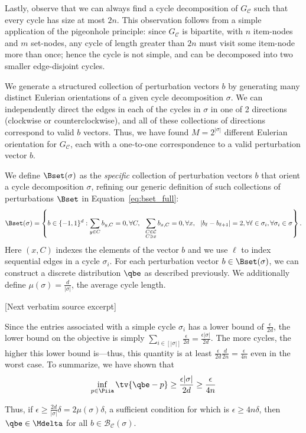 \documentclass[10pt]{article}
\begin{document}
\begin{ReviewVerbatim}
	Lastly, observe that we can always find a cycle decomposition of $G_\mathcal{C}$ such that every cycle has size at most $2n$. This observation follows from a simple application of the pigeonhole principle: since $G_\mathcal{C}$ is bipartite, with $n$ item-nodes and $m$ set-nodes, any cycle of length greater than $2n$ must visit some item-node more than once; hence the cycle is not simple, and can be decomposed into two smaller edge-disjoint cycles.

	We generate a structured collection of perturbation vectors $b$ by generating many distinct Eulerian orientations of a given cycle decomposition $\sigma$. We can independently direct the edges in each of the	cycles in $\sigma$ in one of 2 directions (clockwise or counterclockwise), and all of these collections of directions correspond to valid $b$ vectors. Thus, we have found $M=2^{|\sigma|}$ different Eulerian orientation for $G_\mathcal{C}$, each with a one-to-one correspondence to a valid perturbation vector $b$.

	We define $\Bset(\sigma)$ as the {\it specific} collection of perturbation vectors $b$ that orient a cycle decomposition $\sigma$, refining our generic definition of such collections of perturbations $\Bset$ in Equation~\eqref{eq:bset_full}:
	\begin{align}
	\label{eq:bset}
	\Bset(\sigma) =
	\left \{
	b \in \lbrace -1, 1 \rbrace^d
	:
	\sum_{y \in C} b_{y,C} = 0, \forall C,
	\ \
	\sum_{\substack{C \in \mathcal{C}\\ C \ni x}} b_{x,C} = 0, \forall x,
	\ \
	|b_\ell - b_{\ell+1} | =2, \forall \ell \in \sigma_i,
	\forall \sigma_i \in \sigma
	\right \}.
	\end{align}
	Here $(x,C)$ indexes the elements of the vector $b$ and we use $\ell$ to index sequential edges in a cycle $\sigma_i$. For each perturbation vector $b \in \Bset(\sigma)$, we can construct a discrete distribution $\qbe$ as described previously. We additionally define $\mu(\sigma) = \frac{d}{|\sigma|}$, the average cycle length.

[Next verbatim source excerpt]

		Since the entries associated with a simple cycle $\sigma_i$ has a lower bound of $\frac{\epsilon}{2d}$, the lower bound on the objective is simply $\sum_{i \in [|\sigma|]} \frac{\epsilon}{2d} = \frac{\epsilon |\sigma|}{2d}$. The more cycles, the higher this lower bound is---thus, this quantity is at least $\frac{\epsilon}{2d} \frac{d}{2n} = \frac{\epsilon}{4n}$ even in the worst case. To summarize, we have shown that
		\begin{align*}
		\inf_{p \in \Piia} \tv{\qbe - p} \geq \frac{\epsilon |\sigma|}{2d} \geq \frac{\epsilon}{4n}
		\end{align*}

		Thus, if $\epsilon \geq \frac{2d}{|\sigma|}\delta = 2\mu(\sigma)\delta$, a sufficient condition for which is $\epsilon \geq 4n \delta$, then $\qbe \in \Mdelta$ for all $b \in \mathcal{B}_\mathcal{C}(\sigma)$.
\end{ReviewVerbatim}
\end{document}
